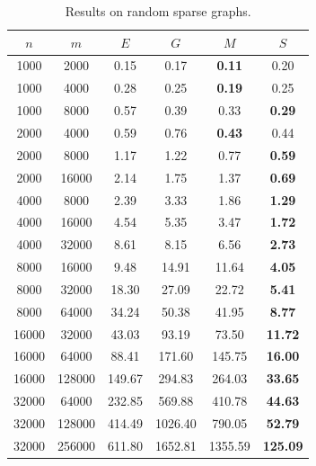 \begin{table}
\centering
\begin{tabular}{
cc|cccc}
$n$ & $m$ & $E$ & $G$ & $M$ & $S$ \\
\hline
1000 & 2000 & 0.15 & 0.17 & \textbf{0.11} & 0.20 \\
1000 & 4000 & 0.28 & 0.25 & \textbf{0.19} & 0.25 \\
1000 & 8000 & 0.57 & 0.39 & 0.33 & \textbf{0.29} \\
2000 & 4000 & 0.59 & 0.76 & \textbf{0.43} & 0.44 \\
2000 & 8000 & 1.17 & 1.22 & 0.77 & \textbf{0.59} \\
2000 & 16000 & 2.14 & 1.75 & 1.37 & \textbf{0.69} \\
4000 & 8000 & 2.39 & 3.33 & 1.86 & \textbf{1.29} \\
4000 & 16000 & 4.54 & 5.35 & 3.47 & \textbf{1.72} \\
4000 & 32000 & 8.61 & 8.15 & 6.56 & \textbf{2.73} \\
8000 & 16000 & 9.48 & 14.91 & 11.64 & \textbf{4.05} \\
8000 & 32000 & 18.30 & 27.09 & 22.72 & \textbf{5.41} \\
8000 & 64000 & 34.24 & 50.38 & 41.95 & \textbf{8.77} \\
16000 & 32000 & 43.03 & 93.19 & 73.50 & \textbf{11.72} \\
16000 & 64000 & 88.41 & 171.60 & 145.75 & \textbf{16.00} \\
16000 & 128000 & 149.67 & 294.83 & 264.03 & \textbf{33.65} \\
32000 & 64000 & 232.85 & 569.88 & 410.78 & \textbf{44.63} \\
32000 & 128000 & 414.49 & 1026.40 & 790.05 & \textbf{52.79} \\
32000 & 256000 & 611.80 & 1652.81 & 1355.59 & \textbf{125.09} \\
\end{tabular}
\caption{Results on random sparse graphs.}\label{tab:sparse}
\end{table}

